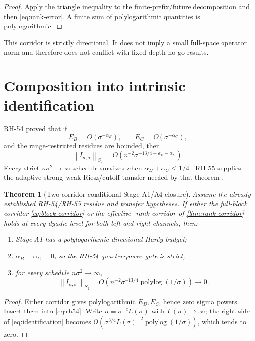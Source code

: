 \documentclass[11pt]{article}
\newtheorem{theorem}{Theorem}[section]
\newcommand{\norm}[1]{\left\lVert#1\right\rVert}
\begin{document}
\begin{proof}
Apply the triangle inequality to the finite-prefix/future decomposition and
then \eqref{eq:rank-error}.  A finite sum of polylogarithmic quantities is
polylogarithmic.
\end{proof}

This corridor is strictly directional.  It does not imply a small full-space
operator norm and therefore does not conflict with fixed-depth no-go results.

\section{Composition into intrinsic identification}

RH-54 proved that if
\[
 E_B=O(\sigma^{-\alpha_B}),\qquad
 E_C=O(\sigma^{-\alpha_C}),
\]
and the range-restricted residues are bounded, then
\begin{equation}
 \norm{I_{n,\sigma}}_{S_2}
 =O\!\left(n^{-2}\sigma^{-13/4-\alpha_B-\alpha_C}\right).
 \label{eq:rh54}
\end{equation}
Every strict $n\sigma^2\to\infty$ schedule survives when
$\alpha_B+\alpha_C\le1/4$ \citep{WangFactor2026}.  RH-55 supplies the adaptive
strong--weak Riesz/cutoff transfer needed by that theorem
\citep{WangStrongWeak2026}.

\begin{theorem}[Two-corridor conditional Stage A1/A4 closure]
\label{thm:composition}
Assume the already established RH-54/RH-55 residue and transfer hypotheses.
If either the full-block corridor \eqref{eq:block-corridor} or the effective-
rank corridor of \cref{thm:rank-corridor} holds at every dyadic level for both
left and right channels, then:
\begin{enumerate}[label=(\roman*),leftmargin=2.2em]
 \item Stage A1 has a polylogarithmic directional Hardy budget;
 \item $\alpha_B=\alpha_C=0$, so the RH-54 quarter-power gate is strict;
 \item for every schedule $n\sigma^2\to\infty$,
 \begin{equation}
  \norm{I_{n,\sigma}}_{S_2}
  =O\!\left(n^{-2}\sigma^{-13/4}
  \operatorname{polylog}(1/\sigma)\right)\longrightarrow0.
  \label{eq:identification}
 \end{equation}
\end{enumerate}
\end{theorem}

\begin{proof}
Either corridor gives polylogarithmic $E_B,E_C$, hence zero sigma powers.
Insert them into \eqref{eq:rh54}.  Write
$n=\sigma^{-2}L(\sigma)$ with $L(\sigma)\to\infty$; the right side of
\eqref{eq:identification} becomes
$O(\sigma^{3/4}L(\sigma)^{-2}\operatorname{polylog}(1/\sigma))$, which tends
to zero.
\end{proof}
\end{document}

